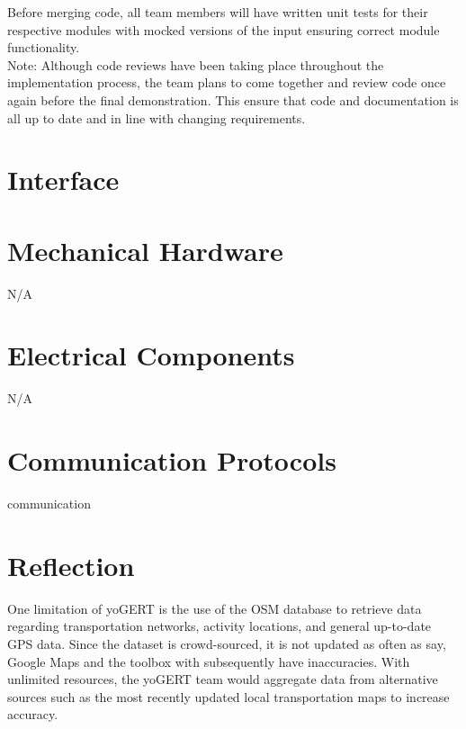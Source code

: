 \documentclass[12pt, titlepage]{article}
\begin{document}
Before merging code, all team members will have written unit tests for their respective modules with mocked versions of the input ensuring correct module functionality. \\

\noindent *Note: Although code reviews have been taking place throughout the implementation process, the team plans to come together and review code once again before the final demonstration. This ensure that code and documentation is all up to date and in line with changing requirements. 



% 

\newpage{}

\appendix

\section{Interface}


\section{Mechanical Hardware}
\noindent N/A
\section{Electrical Components}
\noindent N/A
\section{Communication Protocols}
communication
\section{Reflection}

\noindent One limitation of yoGERT is the use of the OSM database to retrieve data regarding transportation networks, activity locations, and general up-to-date GPS data. Since the dataset is crowd-sourced, it is not updated as often as say, Google Maps and the toolbox with subsequently have inaccuracies. With unlimited resources, the yoGERT team would aggregate data from alternative sources such as the most recently updated local transportation maps to increase accuracy. \\
\end{document}

